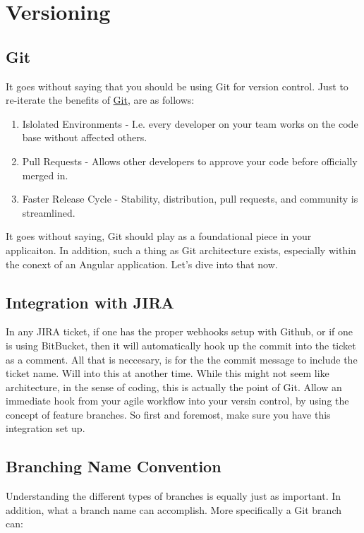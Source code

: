 
\chapter{ Versioning }

\section { Git }
It goes without saying that you should be using Git for version control. Just to re-iterate the benefits of \href{https://git-scm.com/}{Git}, are as follows: 
\begin{enumerate} 
  \item Islolated Environments - I.e. every developer on your team works on the code base without affected others. 
  \item Pull Requests - Allows other developers to approve your code before officially merged in. 
  \item Faster Release Cycle - Stability, distribution, pull requests, and community is streamlined. 
\end{enumerate} 

It goes without saying, Git should play as a foundational piece in your applicaiton. In addition, such a thing as Git architecture exists, especially within the conext of an Angular application. Let's dive into that now. 

\section { Integration with JIRA }
In any JIRA ticket, if one has the proper webhooks setup with Github, or if one
is using BitBucket, then it will automatically hook up the commit into the
ticket as a comment. All that is neccesary, is for the the commit message to include the ticket name. Will into this at another time. While this might not seem like architecture, in the sense of coding, this is actually the point of Git. Allow an immediate hook from your agile workflow into your versin control, by using the concept of feature branches. So first and foremost, make sure you have this integration set up. 

\section { Branching Name Convention }
Understanding the different types of branches is equally just as important. In addition, what a branch name can accomplish. More specifically a Git branch can:

